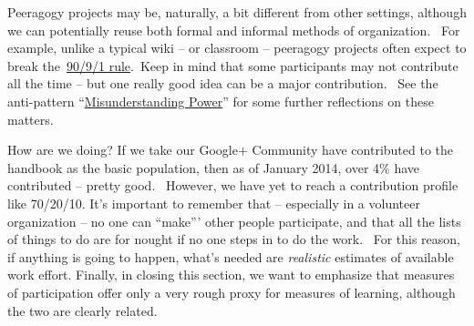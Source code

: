 Peeragogy projects may be, naturally, a bit different from other
settings, although we can potentially reuse both formal and informal
methods of organization.~ For example, unlike a typical wiki -- or
classroom -- peeragogy projects often expect to break
the~\href{http://en.wikipedia.org/wiki/1\%25_rule_\%28Internet_culture\%29}{90/9/1
rule}.~Keep in mind that some participants may not contribute all the
time -- but one really good idea can be a major contribution.~ See the
anti-pattern
``\href{http://peeragogy.org/practice/antipatterns/misunderstanding-power/}{Misunderstanding
Power}'' for some further reflections on these matters.

How are we doing? If we take our Google+ Community have contributed to
the handbook as the basic population, then as of January 2014, over 4\%
have contributed -- pretty good.~ However, we have yet to reach a
contribution profile like 70/20/10. It's important to remember that --
especially in a volunteer organization -- no one can ``make''' other
people participate, and that all the lists of things to do are for
nought if no one steps in to do the work.~ For this reason, if anything
is going to happen, what's needed are \emph{realistic} estimates of
available work effort. Finally, in closing this section, we want to
emphasize that measures of participation offer only a very rough proxy
for measures of learning, although the two are clearly related.

